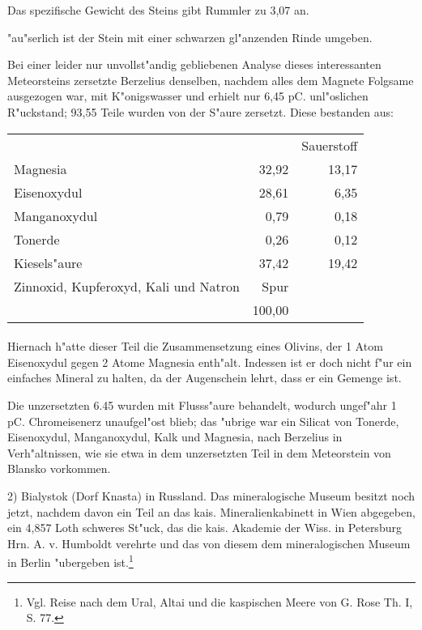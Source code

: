 \documentclass[a4paper, 11pt, oneside, german]{article}
\begin{document}
Das spezifische Gewicht des Steins gibt Rummler zu 3,07 an.

"au"serlich ist der Stein mit einer schwarzen gl"anzenden Rinde umgeben.

Bei einer leider nur unvollst"andig gebliebenen Analyse dieses interessanten Meteorsteins zersetzte Berzelius denselben, nachdem alles dem Magnete Folgsame ausgezogen war, mit K"onigswasser und erhielt nur 6,45 pC. unl"oslichen R"uckstand; 93,55 Teile wurden von der S"aure zersetzt. Diese bestanden aus:
\begin{center}
\begin{tabular}{ l r r }
     & & Sauerstoff\\
    Magnesia & 32,92 & 13,17\\
    Eisenoxydul & 28,61 & 6,35\\
    Manganoxydul & 0,79 & 0,18\\
    Tonerde & 0,26 & 0,12\\
    Kiesels"aure & 37,42 & 19,42\\  
    Zinnoxid, Kupferoxyd, Kali und Natron & Spur & \\  
     & 100,00 & \\
\end{tabular}
\end{center}
\paragraph{}
Hiernach h"atte dieser Teil die Zusammensetzung eines Olivins, der 1 Atom Eisenoxydul gegen 2 Atome Magnesia enth"alt. Indessen ist er doch nicht f"ur ein einfaches Mineral zu halten, da der Augenschein lehrt, dass er ein Gemenge ist.

Die unzersetzten 6.45 wurden mit Flusss"aure behandelt, wodurch ungef"ahr 1 pC. Chromeisenerz unaufgel"ost blieb; das "ubrige war ein Silicat von Tonerde, Eisenoxydul, Manganoxydul, Kalk und Magnesia, nach Berzelius in Verh"altnissen, wie sie etwa in dem unzersetzten Teil in dem Meteorstein von Blansko vorkommen.

2) Bialystok (Dorf Knasta) in Russland. Das mineralogische Museum besitzt noch jetzt, nachdem davon ein Teil an das kais. Mineralienkabinett in Wien abgegeben, ein 4,857 Loth schweres St"uck, das die kais. Akademie der Wiss. in Petersburg Hrn. A. v. Humboldt verehrte und das von diesem dem mineralogischen Museum in Berlin "ubergeben ist.\footnote{Vgl. Reise nach dem Ural, Altai und die kaspischen Meere von G. Rose Th. I, S. 77.}
\end{document}
